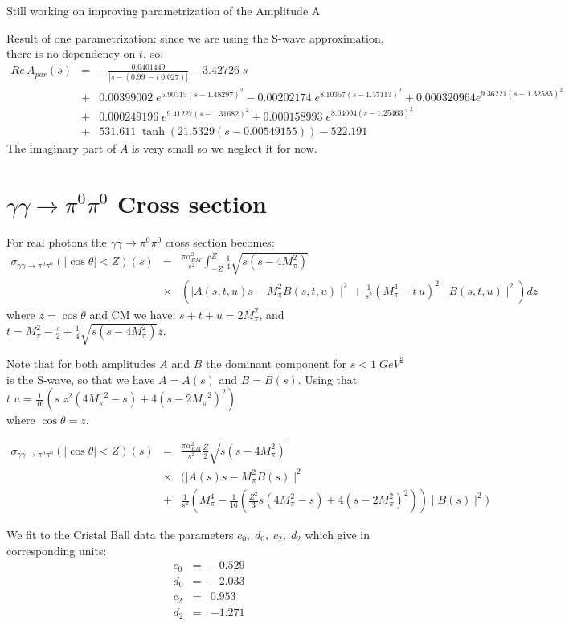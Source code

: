 \documentclass[12pt,epsfig]{article}
\def\red{\color{red}}
\newcommand{\bea}{\begin{eqnarray}}
\newcommand{\eea}{\end{eqnarray}}
\begin{document}
{\red Still working on improving parametrization of the Amplitude A}

Result of one parametrization: since we are using the S-wave approximation, there is no dependency on $t$, so:
\bea
Re\,A_{par}(s)&=&-\frac{0.0401449}{\left| s-(0.99\, -i\;0.027 )\right| }-3.42726\; s\nonumber\\
&+&0.00399002\; e^{5.90315 (s-1.48297)^2}-0.00202174\; e^{8.10357
	(s-1.37113)^2}+0.000320964 e^{9.36221 (s-1.32585)^2}
\nonumber\\
&+&0.000249196\; e^{9.41227 (s-1.31682)^2}+0.000158993 \;e^{8.04004
	(s-1.25463)^2}\nonumber\\
&+&531.611\; \tanh (21.5329 (s-0.00549155))-522.191
\eea
The imaginary part of $A$ is very small so we neglect it for now.


\section{$\gamma\gamma\to\pi^0\pi^0$ Cross section }

For real photons the  $\gamma\gamma\to\pi^0\pi^0$ cross section becomes:
\bea
\sigma_{\gamma\gamma\to\pi^0\pi^0}(|\cos \theta|<Z)(s)&=&\frac{\pi \alpha_{EM}^2}{s^2}
\int_{-Z}^Z  \frac 14  \sqrt{s (s -4 M_\pi^2)} \\
&\times&(\mid A(s,t,u) s-M_\pi^2  B(s,t,u)\mid^2+\frac {1}{s^2} (M_\pi^4- t\,u)^2\mid B(s,t,u)\mid ^2) dz\nonumber
\eea
where $z=\cos\theta$ and CM we have: $s+t+u=2 M_\pi^2$, and $t=M_\pi^2-\frac s 2+\frac 14\sqrt{s(s-4M_\pi^2)} z$.


Note that for both amplitudes $A$ and $B$ the dominant component for $s<1\;GeV^2$ is the S-wave, so that we have $A=A(s)$ and $B=B(s)$. Using that\\
 $t\;u=\frac{1}{16} \left(s \;z^2 \left(4 {M_\pi
	}^2-s\right)+4 \left(s-2 {M_\pi }^2\right)^2\right)$\\
where $\cos \theta=z$.

\bea
\sigma_{\gamma\gamma\to\pi^0\pi^0}(|\cos \theta|<Z)(s)&=&\frac{\pi \alpha_{EM}^2}{s^2}
    \frac Z2  \sqrt{s (s -4 M_\pi^2)} \\
&\times&(\mid A(s) s-M_\pi^2  B(s)\mid^2\nonumber\\
&+&\frac {1}{s^2} \left(M_\pi^4- \frac{1}{16}(\frac{Z^2}{3} s(4 M_\pi^2-s)+4(s-2 M_\pi^2)^2)\right)\mid B(s)\mid ^2) \nonumber
\eea



We fit to the Cristal Ball data the parameters $c_0,\;d_0,\;c_2,\;d_2$ which give in corresponding units: 
\bea
c_0&=& -0.529 \nonumber\\
d_0&=&-2.033 \nonumber\\
c_2&=&0.953\nonumber\\
d_2&=& -1.271\nonumber\\
\eea
\end{document}
